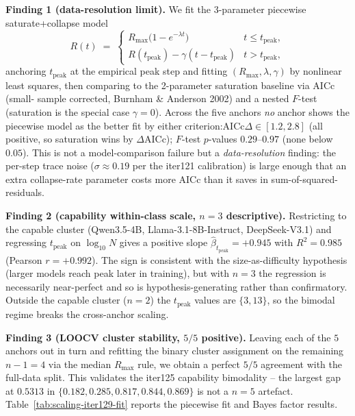 \textbf{Finding 1 (data-resolution limit).}  We fit the 3-parameter
piecewise saturate+collapse model
\begin{equation}
  \label{eq:pw}
  R(t) \;=\; \begin{cases}
    R_{\max}\bigl(1 - e^{-\lambda t}\bigr) & t \le t_\mathrm{peak}, \\
    R(t_\mathrm{peak}) - \gamma(t - t_\mathrm{peak}) & t > t_\mathrm{peak},
  \end{cases}
\end{equation}
anchoring $t_\mathrm{peak}$ at the empirical peak step and fitting
$(R_{\max}, \lambda, \gamma)$ by nonlinear least squares, then
comparing to the 2-parameter saturation baseline via AICc (small-
sample corrected, Burnham \& Anderson 2002) and a nested $F$-test
(saturation is the special case $\gamma = 0$).  Across the five
anchors \emph{no} anchor shows the piecewise model as the better
fit by either criterion:AICc$\Delta \in [1.2, 2.8]$ (all positive,
so saturation wins by $\Delta\text{AICc}$); $F$-test
$p$-values $0.29\text{--}0.97$ (none below $0.05$).  This is not
a model-comparison failure but a \emph{data-resolution} finding:
the per-step trace noise ($\sigma \approx 0.19$ per the iter121
calibration) is large enough that an extra collapse-rate parameter
costs more AICc than it saves in sum-of-squared-residuals.

\textbf{Finding 2 (capability within-class scale, $n=3$
descriptive).}  Restricting to the capable cluster
(Qwen3.5-4B, Llama-3.1-8B-Instruct, DeepSeek-V3.1) and regressing
$t_\mathrm{peak}$ on $\log_{10} N$ gives a positive slope
$\hat\beta_{t_\mathrm{peak}} = +0.945$ with
$R^2 = 0.985$ (Pearson $r = +0.992$).  The sign is consistent
with the size-as-difficulty hypothesis (larger models reach peak
later in training), but with $n=3$ the regression is necessarily
near-perfect and so is hypothesis-generating rather than
confirmatory.  Outside the capable cluster ($n=2$) the
$t_\mathrm{peak}$ values are $\{3, 13\}$, so the bimodal regime
breaks the cross-anchor scaling.

\textbf{Finding 3 (LOOCV cluster stability, $5/5$ positive).}
Leaving each of the $5$ anchors out in turn and refitting the
binary cluster assignment on the remaining $n-1=4$ via the median
$R_{\max}$ rule, we obtain a perfect $5/5$ agreement with the
full-data split.  This validates the iter125 capability
bimodality -- the largest gap at $0.5313$ in
$\{0.182, 0.285, 0.817, 0.844, 0.869\}$ is not a $n=5$
artefact.  Table~\ref{tab:scaling-iter129-fit} reports the
piecewise fit and Bayes factor results.

